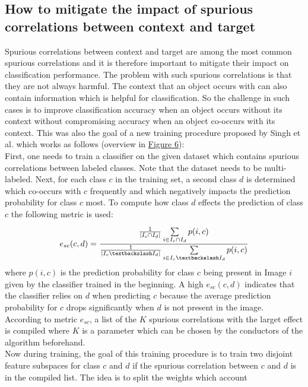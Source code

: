\documentclass{article}
\begin{document}
\subsection{How to mitigate the impact of spurious correlations between context and target}
\label{sec:contextSuppr}
Spurious correlations between context and target are among the most common spurious correlations and it is
therefore important to mitigate their impact on classification performance. The problem with such spurious correlations
is that they are not always harmful. The context that an object occurs with can also contain information which is helpful
for classification. So the challenge in such cases is to improve classification accuracy when an object occurs without
its context without compromising accuracy when an object co-occurs with its context. This was also the goal of a
new training procedure proposed by Singh et al. \cite{Singh_2020_CVPR} which works as follows
(overview in \hyperref[fig:contextSupprImg]{Figure 6}): \\
First, one needs to train a classifier on the given dataset which contains spurious correlations between labeled classes.
Note that the dataset needs to be multi-labeled. Next, for each class $c$ in the training set, a second class $d$ is
determined which co-occurs with $c$ frequently and which negatively impacts the prediction probability for class $c$ most.
To compute how class $d$ effects the prediction of class $c$ the following metric is used:  
\begin{align*}
    e_{sc}(c,d) = \frac{\frac{1}{|I_c \cap I_d|} \sum\limits_{i \in I_c \cap I_d}^{} p(i,c)}
    {\frac{1}{|I_c \textbackslash I_d|} \sum\limits_{i \in I_c \textbackslash I_d} p(i,c)}
\end{align*}
where $p(i,c)$ is the prediction probability for class $c$ being present in Image $i$ given by the classifier
trained in the beginning. A high $e_{sc}(c,d)$ indicates that the classifier relies on $d$ when predicting $c$
because the average prediction probability for $c$ drops significantly when $d$ is not present in the image. \\
According to metric $e_{sc}$, a list of the $K$ spurious correlations with the larget effect is compiled where $K$
is a parameter which can be chosen by the conductors of the algorithm beforehand. \\
Now during training, the goal of this training procedure is to train two disjoint feature subspaces for class $c$ and $d$
if the spurious correlation between $c$ and $d$ is in the compiled list. The idea is to split the weights which account
\end{document}
